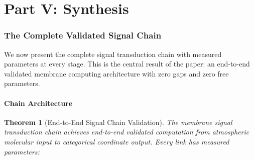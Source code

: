 \documentclass[twocolumn,10pt,a4paper]{article}
\newtheorem{theorem}{Theorem}[section]
\theoremstyle{definition}
\theoremstyle{remark}
\begin{document}

\part*{Part V: Synthesis}

\section{The Complete Validated Signal Chain}
\label{sec:signal_chain}

We now present the complete signal transduction chain with measured parameters at every stage. This is the central result of the paper: an end-to-end validated membrane computing architecture with zero gaps and zero free parameters.

\subsection{Chain Architecture}

\begin{theorem}[End-to-End Signal Chain Validation]
\label{thm:chain}
The membrane signal transduction chain achieves end-to-end validated computation from atmospheric molecular input to categorical coordinate output. Every link has measured parameters:
\end{theorem}
\end{document}
